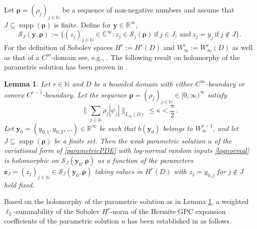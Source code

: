 \documentclass[11pt]{article}
\newtheorem{lemma}{Lemma}[section]
\numberwithin{equation}{section}
\theoremstyle{definition}
\theoremstyle{remark}
\newcommand{\by}{{\boldsymbol{y}}}
\newcommand{\bz}{{\boldsymbol{z}}}
\newcommand{\brho}{{\boldsymbol{\rho}}}
\def\NN{{\mathbb N}}
\def\NN{{\mathbb N}}
\def\CCi{{\mathbb C}^\infty}
\def\RRi{{\mathbb R}^\infty}
\def\NN{{\mathbb N}}
\def\supp{\operatorname{supp}}
\begin{document}
{Let $\brho=(\rho_j)_{j\in \NN}$ be a sequence of
non-negative numbers and assume that $J \subseteq \supp(\brho)$ is
finite. Define for $\by \in \RRi$,
{
\begin{equation}\label{eq:Snubrho}
	\mathcal{S}_J (\by,\brho) := \big\{(z_j)_{j\in \NN} \in \CCi: z_j \in
	\mathcal{S}_j(\brho)\ \text{if}\ j\in J, \ \text{and}\ z_j=y_j \
	\text{if}\ j\not \in J \big\}.
\end{equation}
}
For the definition of Sobolev spaces $H^r:= H^r(D)$ and $W^r_\infty:= W^r_\infty(D)$ {as well as that of a} $C^m$-domain see, e.g., \cite{Adams2003}.
The following result on holomorphy of the parametric solution has been proven in \cite[Proposition 3.21]{DNSZ2023}.
\begin{lemma}\label{lemma:holoh1}
		{Let $r \in \NN$ and $D$ be a bounded domain with either $C^\infty$-boundary or convex $C^{r-1}$-boundary.	}
	Let the sequence $\brho=(\rho_j)_{j\in \NN}\in [0,\infty)^\infty$
	satisfy
\begin{equation}\label{eq:leqkappa}
		\Bigg\|\sum_{j \in \NN} \rho_j |\psi_j | \Bigg\|_{L_\infty(D)} 
		\leq 
		\kappa < \frac{\pi}{2}\,.
	\end{equation}
	Let $\by_0=(y_{0,1},y_{0,2},\ldots) \in {\RRi}$ be such that $b(\by_0)$
	belongs to $W^{r-1}_\infty$, and let $J\subseteq \supp(\brho)$ be a
	finite set.
	Then the weak parametric solution $u$ of the variational form of \eqref{parametricPDE} with log-normal random inputs \eqref{lognormal} is
	holomorphic on $ \mathcal{S}_J (\by_0,\brho) $ as a function of the
	parameters
	$\bz_J=(z_j)_{j \in \NN} \in \mathcal{S}_J (\by_0,\brho)$
	taking values in $H^r(D)$ with $z_j = y_{0,j}$ for $j\not \in J$ held
	fixed.
\end{lemma}

Based on the holomorphy of the parametric solution as in Lemma \ref{lemma:holoh1}, a weighted $\ell_2$-summability of the Sobolev $H^r$-norm of the {Hermite GPC expansion} coefficients of the parametric solution $u$ has been established in 
\cite[Theorem 3.25]{DNSZ2023} as follows.

}
\end{document}
